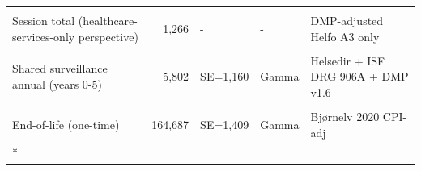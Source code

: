 \begin{ThreePartTable}
\begin{longtable}[t]{lr>{\raggedright\arraybackslash}p{3.7cm}>{\raggedright\arraybackslash}p{3.6cm}>{\raggedright\arraybackslash}p{5.2cm}}
\cellcolor[HTML]{F7F9FC}{\textcolor[HTML]{2D3748}{Session total (extended)}} & \cellcolor[HTML]{F7F9FC}{\textcolor[HTML]{2D3748}{approx 1,827}} & \cellcolor[HTML]{F7F9FC}{\textcolor[HTML]{2D3748}{composite}} & \cellcolor[HTML]{F7F9FC}{\textcolor[HTML]{2D3748}{Gamma}} & \cellcolor[HTML]{F7F9FC}{\textcolor[HTML]{2D3748}{Composite}}\\
\textcolor[HTML]{2D3748}{Session total (healthcare-services-only perspective)} & \textcolor[HTML]{2D3748}{1,266} & \textcolor[HTML]{2D3748}{-} & \textcolor[HTML]{2D3748}{-} & \textcolor[HTML]{2D3748}{DMP-adjusted Helfo A3 only}\\
\cellcolor[HTML]{F7F9FC}{\textcolor[HTML]{2D3748}{Behavioural-support contact (A3a + 1 x A3b, 30 min)}} & \cellcolor[HTML]{F7F9FC}{\textcolor[HTML]{2D3748}{327}} & \cellcolor[HTML]{F7F9FC}{\textcolor[HTML]{2D3748}{-}} & \cellcolor[HTML]{F7F9FC}{\textcolor[HTML]{2D3748}{(via total)}} & \cellcolor[HTML]{F7F9FC}{\textcolor[HTML]{2D3748}{Helfo A3a + 1 x A3b; lower bound of the stated 30-60 min per topic}}\\
\textcolor[HTML]{2D3748}{Shared surveillance annual (years 0-5)} & \textcolor[HTML]{2D3748}{5,802} & \textcolor[HTML]{2D3748}{SE=1,160} & \textcolor[HTML]{2D3748}{Gamma} & \textcolor[HTML]{2D3748}{Helsedir + ISF DRG 906A + DMP v1.6}\\
\cellcolor[HTML]{F7F9FC}{\textcolor[HTML]{2D3748}{Shared progressed-disease annual}} & \cellcolor[HTML]{F7F9FC}{\textcolor[HTML]{2D3748}{198,319}} & \cellcolor[HTML]{F7F9FC}{\textcolor[HTML]{2D3748}{SE=39,664}} & \cellcolor[HTML]{F7F9FC}{\textcolor[HTML]{2D3748}{Gamma}} & \cellcolor[HTML]{F7F9FC}{\textcolor[HTML]{2D3748}{Joranger 2020 OR1 T1; SSB CPI to 2024}}\\
\textcolor[HTML]{2D3748}{End-of-life (one-time)} & \textcolor[HTML]{2D3748}{164,687} & \textcolor[HTML]{2D3748}{SE=1,409} & \textcolor[HTML]{2D3748}{Gamma} & \textcolor[HTML]{2D3748}{Bjørnelv 2020 CPI-adj}\\*
\end{longtable}
\end{ThreePartTable}
\endgroup{}
